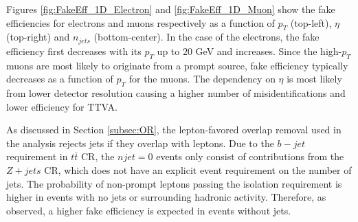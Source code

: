 Figures \ref{fig:FakeEff_1D_Electron} and \ref{fig:FakeEff_1D_Muon} show the fake efficiencies for electrons and muons respectively as a function of $p_{T}$ (top-left), $\eta$ (top-right) and $n_{jets}$ (bottom-center). In the case of the electrons, the fake efficiency first decreases with its $p_{T}$ up to $20$ GeV and increases. Since the high-$p_{T}$ muons are most likely to originate from a prompt source, fake efficiency typically decreases as a function of $p_{T}$ for the muons. The dependency on $\eta$ is most likely from lower detector resolution causing a higher number of misidentifications and lower efficiency for TTVA.

As discussed in Section \ref{subsec:OR}, the lepton-favored overlap removal used in the analysis rejects jets if they overlap with leptons. Due to the $b-jet$ requirement in $t\bar{t}$ CR, the $njet=0$ events only consist of contributions from the $Z+jets$ CR, which does not have an explicit event requirement on the number of jets. The probability of non-prompt leptons passing the isolation requirement is higher in events with no jets or surrounding hadronic activity. Therefore, as observed, a higher fake efficiency is expected in events without jets.  

